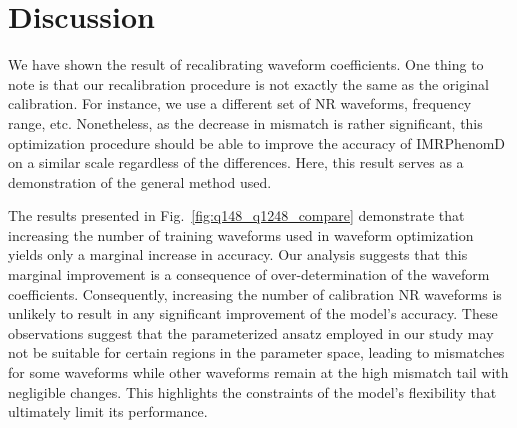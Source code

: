 \documentclass[twocolumn]{aastex631}
\begin{document}
\section{Discussion} \label{sec:discussion}


We have shown the result of recalibrating waveform coefficients. One thing to
note is that our recalibration procedure is not exactly the same as the original
calibration. For instance, we use a different set of NR waveforms, frequency
range, etc. Nonetheless, as the decrease in mismatch is rather significant, this
optimization procedure should be able to improve the accuracy of IMRPhenomD on a
similar scale regardless of the differences. Here, this result serves as a
demonstration of the general method used.  

The results presented in Fig.~\ref{fig:q148_q1248_compare} demonstrate that
increasing the number of training waveforms used in waveform optimization yields
only a marginal increase in accuracy. Our analysis suggests that this marginal
improvement is a consequence of over-determination of the waveform coefficients.
Consequently, increasing the number of calibration NR waveforms is unlikely to
result in any significant improvement of the model's accuracy. These
observations suggest that the parameterized ansatz employed in our study may not
be suitable for certain regions in the parameter space, leading to mismatches
for some waveforms while other waveforms remain at the high mismatch tail with
negligible changes. This highlights the constraints of the model's flexibility
that ultimately limit its performance.
\end{document}
